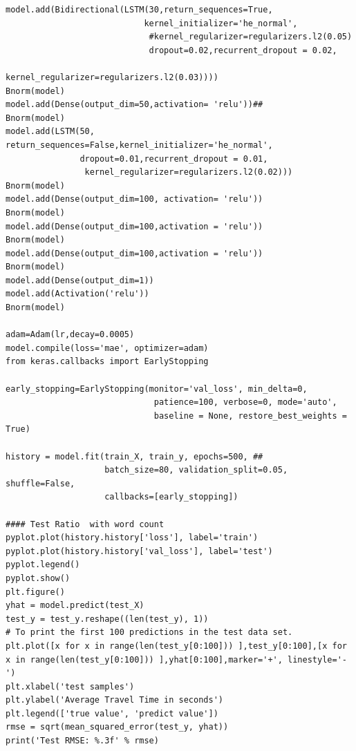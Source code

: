 \documentclass[12pt]{article}
\begin{document}
\begin{appendices}
\begin{lstlisting}
model.add(Bidirectional(LSTM(30,return_sequences=True,
                            kernel_initializer='he_normal',
                             #kernel_regularizer=regularizers.l2(0.05)
                             dropout=0.02,recurrent_dropout = 0.02,
                            kernel_regularizer=regularizers.l2(0.03))))                           
Bnorm(model)
model.add(Dense(output_dim=50,activation= 'relu'))##
Bnorm(model)
model.add(LSTM(50, return_sequences=False,kernel_initializer='he_normal',
               dropout=0.01,recurrent_dropout = 0.01,
                kernel_regularizer=regularizers.l2(0.02)))
Bnorm(model)
model.add(Dense(output_dim=100, activation= 'relu'))
Bnorm(model)
model.add(Dense(output_dim=100,activation = 'relu'))
Bnorm(model)
model.add(Dense(output_dim=100,activation = 'relu'))
Bnorm(model)
model.add(Dense(output_dim=1))
model.add(Activation('relu'))
Bnorm(model)

adam=Adam(lr,decay=0.0005)
model.compile(loss='mae', optimizer=adam)
from keras.callbacks import EarlyStopping
 
early_stopping=EarlyStopping(monitor='val_loss', min_delta=0,
                              patience=100, verbose=0, mode='auto',
                              baseline = None, restore_best_weights = True)

history = model.fit(train_X, train_y, epochs=500, ##
                    batch_size=80, validation_split=0.05, shuffle=False,
                    callbacks=[early_stopping])
    
#### Test Ratio  with word count
pyplot.plot(history.history['loss'], label='train')
pyplot.plot(history.history['val_loss'], label='test')
pyplot.legend()
pyplot.show()
plt.figure()
yhat = model.predict(test_X)
test_y = test_y.reshape((len(test_y), 1))
# To print the first 100 predictions in the test data set.
plt.plot([x for x in range(len(test_y[0:100])) ],test_y[0:100],[x for x in range(len(test_y[0:100])) ],yhat[0:100],marker='+', linestyle='-')
plt.xlabel('test samples')
plt.ylabel('Average Travel Time in seconds')
plt.legend(['true value', 'predict value'])
rmse = sqrt(mean_squared_error(test_y, yhat))
print('Test RMSE: %.3f' % rmse)

\end{lstlisting}

\end{appendices}
\end{document}
